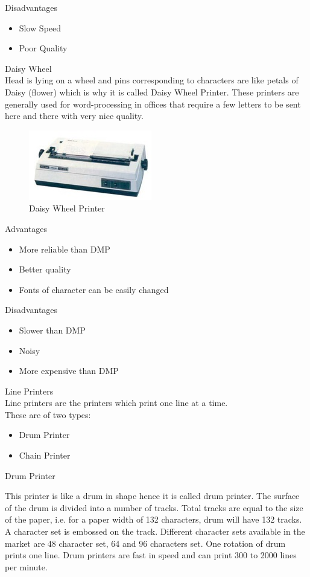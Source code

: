\documentclass[11pt,a4paper,twoside]{article}
\begin{document}
Disadvantages  
\begin{itemize}
    \item Slow Speed
\item Poor Quality
\end{itemize}
Daisy Wheel \\
Head is lying on a wheel and pins corresponding to characters are like petals of Daisy (flower) which is why it is called Daisy Wheel Printer. These printers are generally used for word-processing in offices that require a few letters to be sent here and there with very nice quality.
\begin{figure}[H]
\centering \includegraphics[scale=1]{Fig 16.jpg}
\caption{Daisy Wheel Printer}
\end{figure}
\noindent Advantages 
\begin{itemize}
    \item More reliable than DMP
\item Better quality
\item Fonts of character can be easily changed
\end{itemize}
Disadvantages  
\begin{itemize}
    \item Slower than DMP
\item Noisy
\item More expensive than DMP
\end{itemize}
Line Printers \\
Line printers are the printers which print one line at a time.\\
These are of two types:  
\begin{itemize}
    \item Drum Printer
\item Chain Printer
\end{itemize}
Drum Printer\par 
This printer is like a drum in shape hence it is called drum printer. The surface of the drum is divided into a number of tracks. Total tracks are equal to the size of the paper, i.e. for a paper width of 132 characters, drum will have 132 tracks. A character set is embossed on the track. Different character sets available in the market are 48 character set, 64 and 96 characters set. One rotation of drum prints one line. Drum printers are fast in speed and can print 300 to 2000 lines per minute. 
\end{document}
